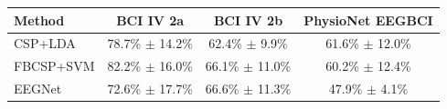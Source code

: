 \begin{tabular}{lccc}
\toprule
Method & BCI IV 2a & BCI IV 2b & PhysioNet EEGBCI \\
\midrule
CSP+LDA & 78.7\% $\pm$ 14.2\% & 62.4\% $\pm$ 9.9\% & 61.6\% $\pm$ 12.0\% \\
FBCSP+SVM & 82.2\% $\pm$ 16.0\% & 66.1\% $\pm$ 11.0\% & 60.2\% $\pm$ 12.4\% \\
EEGNet & 72.6\% $\pm$ 17.7\% & 66.6\% $\pm$ 11.3\% & 47.9\% $\pm$ 4.1\% \\
\bottomrule
\end{tabular}